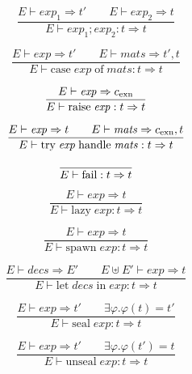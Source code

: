 \documentclass[twoside]{article}
\newcommand{\x}[1]{\mathit{#1}}
\newcommand{\f}[1]{\mbox{#1}}
\renewcommand{\c}[1]{c_{\f{\scriptsize #1}}}
\renewcommand{\exp}{\x{exp}}
\newcommand{\mats}{\x{mats}}
\newcommand{\decs}{\x{decs}}
\begin{document}
\begin{equation}
\frac{
E \vdash \exp_1 \Rightarrow t'
\qquad
E \vdash \exp_2 \Rightarrow t
}{
E \vdash \exp_1;\exp_2 : t \Rightarrow t
}
\end{equation}

\begin{equation}
\frac{
E \vdash \exp \Rightarrow t'
\qquad
E \vdash \mats \Rightarrow t',t
}{
E \vdash \f{case}\;\exp\;\f{of}\;\mats : t \Rightarrow t
}
\end{equation}

\begin{equation}
\frac{
E \vdash \exp \Rightarrow \c{exn}
}{
E \vdash \f{raise}\;\exp : t \Rightarrow t
}
\end{equation}

\begin{equation}
\frac{
E \vdash \exp \Rightarrow t
\qquad
E \vdash \mats \Rightarrow \c{exn},t
}{
E \vdash \f{try}\;\exp\;\f{handle}\;\mats : t \Rightarrow t
}
\end{equation}

\begin{equation}
\frac{
}{
E \vdash \f{fail} : t \Rightarrow t
}
\end{equation}

\begin{equation}
\frac{
E \vdash \exp \Rightarrow t
}{
E \vdash \f{lazy}\;\exp : t \Rightarrow t
}
\end{equation}

\begin{equation}
\frac{
E \vdash \exp \Rightarrow t
}{
E \vdash \f{spawn}\;\exp : t \Rightarrow t
}
\end{equation}

\begin{equation}
\frac{
E \vdash \decs \Rightarrow E'
\qquad
E \uplus E' \vdash \exp \Rightarrow t
}{
E \vdash \f{let}\;\decs\;\f{in}\;\exp : t \Rightarrow t
}
\end{equation}

\begin{equation}
\frac{
E \vdash \exp \Rightarrow t'
\qquad
\exists \varphi . \varphi(t) = t'
}{
E \vdash \f{seal}\;\exp : t \Rightarrow t
}
\end{equation}

\begin{equation}
\frac{
E \vdash \exp \Rightarrow t'
\qquad
\exists \varphi . \varphi(t') = t
}{
E \vdash \f{unseal}\;\exp : t \Rightarrow t
}
\end{equation}
\end{document}
